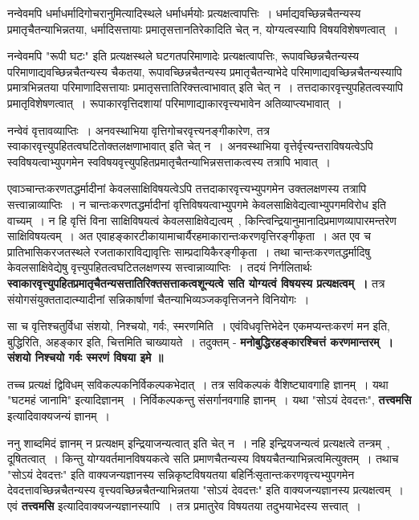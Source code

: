 	नन्वेवमपि धर्माधर्मादिगोचरानुमित्यादिस्थले धर्माधर्मयोः प्रत्यक्षत्वापत्तिः~। धर्माद्यवच्छिन्नचैतन्यस्य प्रमातृचैतन्याभिन्नतया, धर्मादिसत्तायाः प्रमातृसत्तानतिरेकादिति चेत् न, योग्यत्वस्यापि विषयविशेषणत्वात्~। \par
	नन्वेवमपि "रूपी घटः" इति प्रत्यक्षस्थले घटगतपरिमाणादेः प्रत्यक्षत्वापत्तिः, रूपावच्छिन्नचैतन्यस्य परिमाणाद्यवच्छिन्नचैतन्यस्य चैकतया, रूपावच्छिन्नचैतन्यस्य प्रमातृचैतन्याभेदे परिमाणाद्यवच्छिन्नचैतन्यस्यापि प्रमात्रभिन्नतया परिमाणादिसत्तायाः प्रमातृसत्तातिरिक्त्तत्वाभावात् इति चेत् न~। तत्तदाकारवृत्त्युपहितत्वस्यापि प्रमातृविशेषणत्वात्~। रूपाकारवृत्तिदशायां परिमाणाद्याकारवृत्त्यभावेन अतिव्याप्त्यभावात्~। \par
	नन्वेवं वृत्तावव्याप्तिः~। अनवस्थाभिया वृत्तिगोचरवृत्त्यनङ्गीकारेण, तत्र स्वाकारवृत्त्युपहितत्वघटितोक्तलक्षणाभावात् इति चेत् न~। अनवस्थाभिया वृत्तेर्वृत्त्यन्तराविषयत्वेऽपि स्वविषयत्वाभ्युपगमेन स्वविषयवृत्त्युपहितप्रमातृचैतन्याभिन्नसत्ताकत्वस्य तत्रापि भावात्~।\par
	एवाञ्चान्तःकरणतद्धर्मादीनां केवलसाक्षिविषयत्वेऽपि तत्तदाकारवृत्त्यभ्युपगमेन उक्तलक्षणस्य तत्रापि सत्त्वान्नाव्याप्तिः~। न चान्तःकरणतद्धर्मादीनां वृत्तिविषयत्वाभ्युपगमे केवलसाक्षिवेद्यत्वाभ्युपगमविरोध इति वाच्यम्~। न हि वृत्तिं विना साक्षिविषयत्वं केवलसाक्षिवेद्यत्वम्~, किन्त्विन्द्रियानुमानादिप्रमाणव्यापारमन्तरेण साक्षिविषयत्वम्~। अत एवाहङ्कारटीकायामाचार्यैरहमाकारान्तःकरणवृत्तिरङ्गीकृता~। अत एव च प्रातिभासिकरजतस्थले रजताकाराविद्यावृत्तिः साम्प्रदायिकैरङ्गीकृता~। तथा चान्तःकरणतद्धर्मादिषु केवलसाक्षिवेद्येषु वृत्त्युपहितत्वघटितलक्षणस्य सत्त्वान्नाव्याप्तिः~। तदयं निर्गलितार्थः {\bfseries स्वाकारवृत्त्युपहितप्रमातृचैतन्यसत्तातिरिक्तसत्ताकत्वशून्यत्वे सति योग्यत्वं विषयस्य प्रत्यक्षत्वम्~।} तत्र संयोगसंयुक्ततादात्म्यादीनां सन्निकार्षाणां चैतन्याभिव्यञ्जकवृत्तिजनने विनियोगः~। \par
	सा च वृत्तिश्चतुर्विधा संशयो, निश्चयो, गर्वः, स्मरणमिति~। एवंविधवृत्तिभेदेन एकमप्यन्तःकरणं मन इति, बुद्धिरिति, अहङ्कार इति, चित्तमिति चाख्यायते~। तदुक्तम् - {\bfseries मनोबुद्धिरहङ्कारश्चित्तं करणमान्तरम्~। संशयो निश्चयो गर्वः स्मरणं विषया इमे ॥} \par
	तच्च प्रत्यक्षं द्विविधम् सविकल्पकनिर्विकल्पकभेदात्~। तत्र सविकल्पकं वैशिष्ट्यावगाहि ज्ञानम्~। यथा "घटमहं जानामि" इत्यादिज्ञानम्~। निर्विकल्पकन्तु संसर्गानवगाहि ज्ञानम्~। यथा "सोऽयं देवदत्तः", {\bfseries तत्त्वमसि} इत्यादिवाक्यजन्यं ज्ञानम्~। \par
	ननु शाब्दमिदं ज्ञानम् न प्रत्यक्षम् इन्द्रियाजन्यत्वात् इति चेत् न~। नहि इन्द्रियजन्यत्वं प्रत्यक्षत्वे तन्त्रम्~, दूषितत्वात्~। किन्तु योग्यवर्तमानविषयकत्वे सति प्रमाणचैतन्यस्य विषयचैतन्याभिन्नत्वमित्युक्तम्~। तथाच "सोऽयं देवदत्तः" इति वाक्यजन्यज्ञानस्य सन्निकृष्टविषयतया बहिर्निःसृतान्तःकरणवृत्त्यभ्युपगमेन देवदत्तावच्छिन्नचैतन्यस्य वृत्त्यवच्छिन्नचैतन्याभिन्नतया "सोऽयं देवदत्तः" इति वाक्यजन्यज्ञानस्य प्रत्यक्षत्वम्~। एवं {\bfseries तत्त्वमसि} इत्यादिवाक्यजन्यज्ञानस्यापि~। तत्र प्रमातुरेव विषयतया तदुभयाभेदस्य सत्त्वात्~।\par
